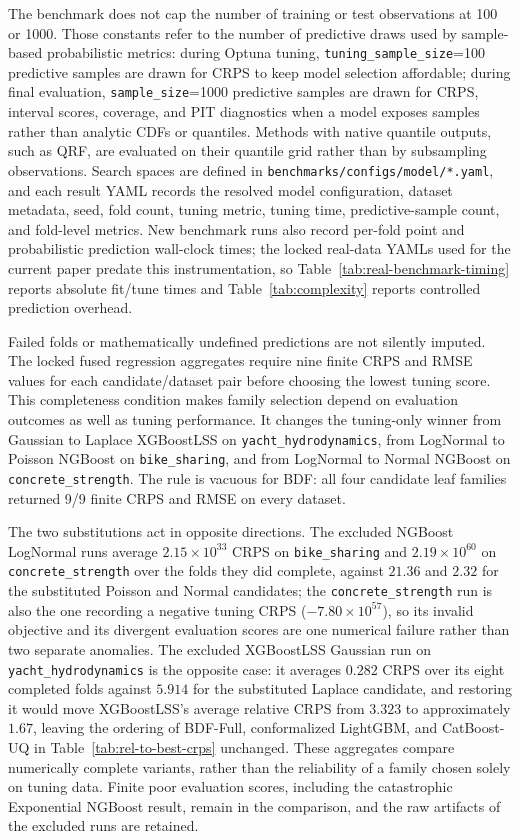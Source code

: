 The benchmark does not cap the number of training or test observations at 100 or 1000. Those constants refer to the number of predictive draws used by sample-based probabilistic metrics: during Optuna tuning, \texttt{tuning\_sample\_size}=100 predictive samples are drawn for CRPS to keep model selection affordable; during final evaluation, \texttt{sample\_size}=1000 predictive samples are drawn for CRPS, interval scores, coverage, and PIT diagnostics when a model exposes samples rather than analytic CDFs or quantiles. Methods with native quantile outputs, such as QRF, are evaluated on their quantile grid rather than by subsampling observations. Search spaces are defined in \texttt{benchmarks/configs/model/*.yaml}, and each result YAML records the resolved model configuration, dataset metadata, seed, fold count, tuning metric, tuning time, predictive-sample count, and fold-level metrics. New benchmark runs also record per-fold point and probabilistic prediction wall-clock times; the locked real-data YAMLs used for the current paper predate this instrumentation, so Table~\ref{tab:real-benchmark-timing} reports absolute fit/tune times and Table~\ref{tab:complexity} reports controlled prediction overhead.

Failed folds or mathematically undefined predictions are not silently imputed. The locked fused regression aggregates require nine finite CRPS and RMSE values for each candidate/dataset pair before choosing the lowest tuning score. This completeness condition makes family selection depend on evaluation outcomes as well as tuning performance. It changes the tuning-only winner from Gaussian to Laplace XGBoostLSS on \texttt{yacht\_hydrodynamics}, from LogNormal to Poisson NGBoost on \texttt{bike\_sharing}, and from LogNormal to Normal NGBoost on \texttt{concrete\_strength}. The rule is vacuous for BDF: all four candidate leaf families returned 9/9 finite CRPS and RMSE on every dataset.

The two substitutions act in opposite directions. The excluded NGBoost LogNormal runs average $2.15\times10^{33}$ CRPS on \texttt{bike\_sharing} and $2.19\times10^{60}$ on \texttt{concrete\_strength} over the folds they did complete, against $21.36$ and $2.32$ for the substituted Poisson and Normal candidates; the \texttt{concrete\_strength} run is also the one recording a negative tuning CRPS ($-7.80\times10^{57}$), so its invalid objective and its divergent evaluation scores are one numerical failure rather than two separate anomalies. The excluded XGBoostLSS Gaussian run on \texttt{yacht\_hydrodynamics} is the opposite case: it averages $0.282$ CRPS over its eight completed folds against $5.914$ for the substituted Laplace candidate, and restoring it would move XGBoostLSS's average relative CRPS from $3.323$ to approximately $1.67$, leaving the ordering of BDF-Full, conformalized LightGBM, and CatBoost-UQ in Table~\ref{tab:rel-to-best-crps} unchanged. These aggregates compare numerically complete variants, rather than the reliability of a family chosen solely on tuning data. Finite poor evaluation scores, including the catastrophic Exponential NGBoost result, remain in the comparison, and the raw artifacts of the excluded runs are retained.

